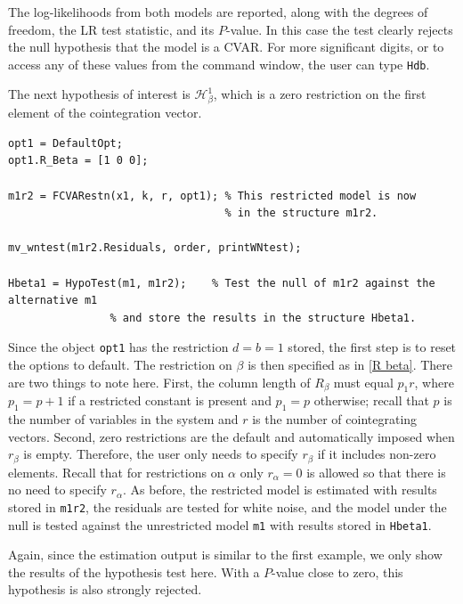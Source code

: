 \documentclass[10pt]{article}
\begin{document}
The log-likelihoods from both models are reported, along with the degrees of freedom, the LR test statistic, and its $P$-value. In this case the test clearly rejects the null hypothesis that the model is a CVAR. For more significant digits, or to access any of these values from the command window, the user can type \verb|Hdb|.

The next hypothesis of interest is $\mathscr{H}_{\beta}^1$, which is a zero restriction on the first element of the cointegration vector. 

\begin{lstlisting}[frame=single,caption={Hypothesis $\mathscr{H}_{\beta}^1$}, label = Hb1]
%% Test restriction that political variables do not enter the cointegrating relation(s).
opt1 = DefaultOpt;
opt1.R_Beta = [1 0 0];

m1r2 = FCVARestn(x1, k, r, opt1); % This restricted model is now 
                                  % in the structure m1r2.

mv_wntest(m1r2.Residuals, order, printWNtest);

Hbeta1 = HypoTest(m1, m1r2); 	% Test the null of m1r2 against the alternative m1 
				% and store the results in the structure Hbeta1.
\end{lstlisting}

Since the object \verb|opt1| has the restriction $d=b=1$ stored, the first step is to reset the options to default. The restriction on $\beta$ is then specified as in \eqref{R beta}. There are two things to note here. First, the column length of $R_{\beta}$ must equal $p_1 r$, where $p_1=p+1$ if a restricted constant is present and $p_1=p$ otherwise; recall that $p$ is the number of variables in the system and $r$ is the number of cointegrating vectors. Second, zero restrictions are the default and automatically imposed when $r_{\beta}$ is empty. Therefore, the user only needs to specify $r_{\beta}$ if it includes non-zero elements. Recall that for restrictions on $\alpha$ only $r_\alpha = 0$ is allowed so that there is no need to specify $r_\alpha$. As before, the restricted model is estimated with results stored in \verb|m1r2|, the residuals are tested for white noise, and the model under the null is tested against the unrestricted model \verb|m1| with results stored in \verb|Hbeta1|.

Again, since the estimation output is similar to the first example, we only show the results of the hypothesis test here. With a $P$-value close to zero, this hypothesis is also strongly rejected.
\end{document}
